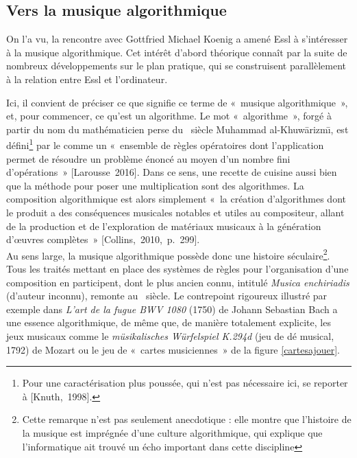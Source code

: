 \documentclass[a4paper,12pt]{article}
\newcommand{\guill}[1]{«~#1~»}
\newcommand{\cicite}[1]{{\footnotesize[#1]}}
\begin{document}
\subsection{Vers la musique algorithmique}
\label{parcoursalgo}

On l'a vu, la rencontre avec Gottfried Michael Koenig a amené Essl à s'intéresser à la musique algorithmique. Cet intérêt d'abord théorique connaît par la suite de nombreux développements sur le plan pratique, qui se construisent parallèlement à la relation entre Essl et l'ordinateur.

Ici, il convient de préciser ce que signifie ce terme de \guill{musique algorithmique}, et, pour commencer, ce qu'est un algorithme. Le mot \guill{algorithme}, forgé à partir du nom du mathématicien perse du \IXe~siècle Muhammad al-Khuw\=arizm\=\i, est défini\footnote{Pour une caractérisation plus poussée, qui n'est pas nécessaire ici, se reporter à \cicite{Knuth,~1998}.} par le comme un \guill{ensemble de règles opératoires dont l'application permet de résoudre un problème énoncé au moyen d'un nombre fini d'opérations} \cicite{Larousse~2016}. Dans ce sens, une recette de cuisine aussi bien que la méthode pour poser une multiplication sont des algorithmes. La composition algorithmique est alors simplement \guill{la création d'algorithmes dont le produit a des conséquences musicales notables et utiles au compositeur, allant de la production et de l'exploration de matériaux musicaux à la génération d'œuvres complètes} \cicite{Collins,~2010,~p.~299}. \\
Au sens large, la musique algorithmique possède donc une histoire séculaire\footnote{Cette remarque n'est pas seulement anecdotique : elle montre que l'histoire de la musique est imprégnée d'une culture algorithmique, qui explique que l'informatique ait trouvé un écho important dans cette discipline}. Tous les traités mettant en place des systèmes de règles pour l'organisation d'une composition en participent, dont le plus ancien connu, intitulé \emph{Musica enchiriadis} (d'auteur inconnu), remonte au \IXe~siècle. Le contrepoint rigoureux illustré par exemple dans \emph{L'art de la fugue BWV 1080} (1750) de Johann Sebastian Bach a une essence algorithmique, de même que, de manière totalement explicite, les jeux musicaux comme le \emph{müsikalisches Würfelspiel K.294d} (jeu de dé musical, 1792) de Mozart ou le jeu de \guill{cartes musiciennes} de la figure \ref{cartesajouer}. \\
\end{document}
